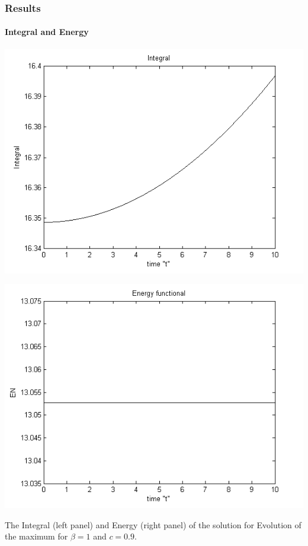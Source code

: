 \documentclass{beamer}
\begin{document}
\begin{frame}
\frametitle{Results}
\framesubtitle{Integral and Energy}
\begin{center}\vspace{0.4cm}
	\begin{minipage}[b]{0.4\linewidth}
		 \includegraphics[width=\linewidth]{figures/Integral.png}
	\end{minipage}	
	\begin{minipage}[b]{0.4\linewidth}
		\includegraphics[width=\linewidth]{figures/Energy.png}
		
	\end{minipage}

\end{center}
The Integral  (left panel) and Energy (right panel) of the solution for Evolution of the maximum for  $\beta=1$ and $c = 0.9$.
\end{frame}
\end{document}
